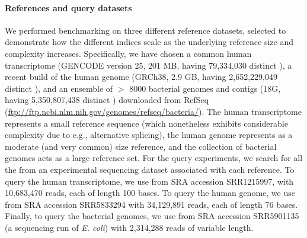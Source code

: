 \paragraph{References and query datasets}
We performed benchmarking on three different reference datasets,
selected to demonstrate how the different indices scale as the underlying reference
size and complexity increases. Specifically, we have chosen a common human transcriptome
(GENCODE version 25, 201 MB, having 79,334,030 distinct \kmers),
a recent build of the human genome (GRCh38, 2.9 GB, having 2,652,229,049 distinct \kmers),
and an ensemble of $>$ 8000 bacterial genomes and contigs (18G, having 5,350,807,438 distinct \kmers)
downloaded from
RefSeq (\url{ftp://ftp.ncbi.nlm.nih.gov/genomes/refseq/bacteria/}).
The human transcriptome represents a small reference sequence (which nonetheless exhibits considerable complexity due to e.g., alternative splicing), the human genome represents as a moderate (and very common) size reference, and the collection of bacterial genomes acts as a large reference set. For the \kmer query experiments, we search for all the \kmers from an experimental sequencing dataset associated with each reference. To query the human transcriptome, we use \kmers from SRA accession SRR1215997, with 10,683,470 reads, each of length 100 bases.  To query the human genome, we use \kmers from SRA accession SRR5833294 with 34,129,891 reads, each of length 76 bases.  Finally, to query the bacterial genomes, we use \kmers from SRA accession SRR5901135 (a sequencing run of \textit{E. coli}) with 2,314,288 reads of variable length.


